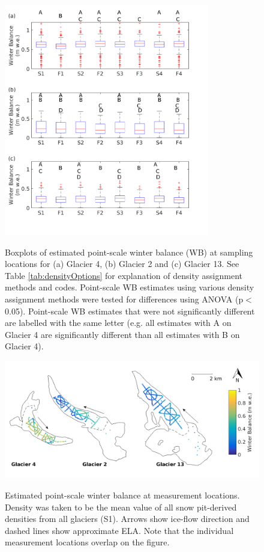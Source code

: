 \documentclass{sfuthesis}
\begin{document}
\begin{figure}
	\centering
	\includegraphics[width = 0.8\textwidth]{AllSWEopts_boxplot.png}\\
	\caption{Boxplots of estimated point-scale winter balance (WB) at sampling locations for (a) Glacier 4, (b) Glacier 2 and (c) Glacier 13. See Table \ref{tab:densityOptions} for explanation of density assignment methods and codes. Point-scale WB estimates using various density assignment methods were tested for differences using ANOVA (p$<$0.05). Point-scale WB estimates that were not significantly different are labelled with the same letter (e.g. all estimates with A on Glacier 4 are significantly different than all estimates with B on Glacier 4).}
	\label{fig:AllSWEopts_boxplot}
\end{figure}


\begin{figure}
	\centering
	\includegraphics[width = \textwidth]{SWEmap_opt2.png}\\
	\caption{Estimated point-scale winter balance at measurement locations. Density was taken to be the mean value of all snow pit-derived densities from all glaciers (S1). Arrows show ice-flow direction and dashed lines show approximate ELA. Note that the individual measurement locations overlap on the figure.}
	\label{fig:SWEmap_S1}
\end{figure}
\end{document}
